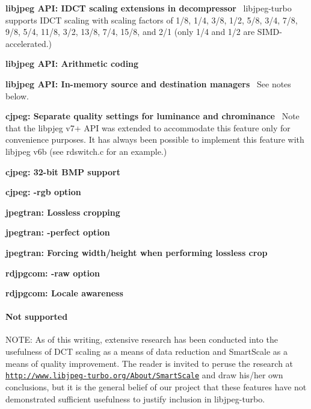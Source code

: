\begin{DoxyItemize}
\item {\bfseries libjpeg A\+PI\+: I\+D\+CT scaling extensions in decompressor}~\newline
 libjpeg-\/turbo supports I\+D\+CT scaling with scaling factors of 1/8, 1/4, 3/8, 1/2, 5/8, 3/4, 7/8, 9/8, 5/4, 11/8, 3/2, 13/8, 7/4, 15/8, and 2/1 (only 1/4 and 1/2 are S\+I\+M\+D-\/accelerated.)
\item {\bfseries libjpeg A\+PI\+: Arithmetic coding}
\item {\bfseries libjpeg A\+PI\+: In-\/memory source and destination managers}~\newline
 See notes below.
\item {\bfseries cjpeg\+: Separate quality settings for luminance and chrominance}~\newline
 Note that the libpjeg v7+ A\+PI was extended to accommodate this feature only for convenience purposes. It has always been possible to implement this feature with libjpeg v6b (see rdswitch.\+c for an example.)
\item {\bfseries cjpeg\+: 32-\/bit B\+MP support}
\item {\bfseries cjpeg\+: {\ttfamily -\/rgb} option}
\item {\bfseries jpegtran\+: Lossless cropping}
\item {\bfseries jpegtran\+: {\ttfamily -\/perfect} option}
\item {\bfseries jpegtran\+: Forcing width/height when performing lossless crop}
\item {\bfseries rdjpgcom\+: {\ttfamily -\/raw} option}
\item {\bfseries rdjpgcom\+: Locale awareness}
\end{DoxyItemize}

\paragraph*{Not supported}

N\+O\+TE\+: As of this writing, extensive research has been conducted into the usefulness of D\+CT scaling as a means of data reduction and Smart\+Scale as a means of quality improvement. The reader is invited to peruse the research at \href{http://www.libjpeg-turbo.org/About/SmartScale}{\tt http\+://www.\+libjpeg-\/turbo.\+org/\+About/\+Smart\+Scale} and draw his/her own conclusions, but it is the general belief of our project that these features have not demonstrated sufficient usefulness to justify inclusion in libjpeg-\/turbo.


